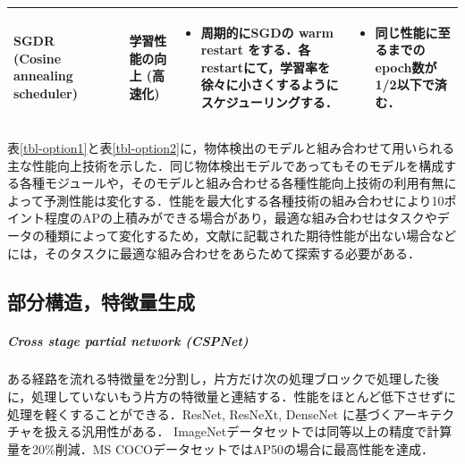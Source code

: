 \documentclass[twocolumn]{jsarticle} %
\begin{document}
\begin{table}
\begin{center}
\begin{tabularx}{\linewidth}{XcXp{7cm}X}
            SGDR (Cosine annealing scheduler) & \cite{LoshHut17} & 学習性能の向上 (高速化) & 
            \begin{itemize}
                \vspace{-0.7\baselineskip}
                \setlength{\leftskip}{-3mm}
                \item 周期的にSGDの warm restart をする．各restartにて，学習率を徐々に小さくするようにスケジューリングする．
            \end{itemize}
            &
            \begin{itemize}
                \vspace{-0.7\baselineskip}
                \setlength{\leftskip}{-3mm}
                \item 同じ性能に至るまでのepoch数が1/2以下で済む．
            \end{itemize}
            \\

            \bottomrule
        \end{tabularx}
    \end{center}
\end{table}%

表\ref{tbl-option1}と表\ref{tbl-option2}に，物体検出のモデルと組み合わせて用いられる主な性能向上技術を示した．同じ物体検出モデルであってもそのモデルを構成する各種モジュールや，そのモデルと組み合わせる各種性能向上技術の利用有無によって予測性能は変化する．性能を最大化する各種技術の組み合わせにより10ポイント程度のAPの上積みができる場合があり，最適な組み合わせはタスクやデータの種類によって変化するため，文献に記載された期待性能が出ない場合などには，そのタスクに最適な組み合わせをあらためて探索する必要がある．

\subsection{部分構造，特徴量生成}
\subparagraph{Cross stage partial network (CSPNet) \cite{WLWCHY20}}ある経路を流れる特徴量を2分割し，片方だけ次の処理ブロックで処理した後に，処理していないもう片方の特徴量と連結する．性能をほとんど低下させずに処理を軽くすることができる．ResNet, ResNeXt, DenseNet に基づくアーキテクチャを扱える汎用性がある．
ImageNetデータセットでは同等以上の精度で計算量を20\%削減．MS COCOデータセットではAP50の場合に最高性能を達成．
\end{document}
